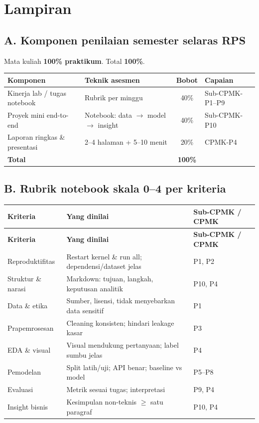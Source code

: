 \chapter*{Lampiran}

\section*{A. Komponen penilaian semester selaras RPS}

Mata kuliah \textbf{100\% praktikum}. Total \textbf{100\%}.

\begin{center}
\small
\begin{tabular}{|p{3.5cm}|p{3.8cm}|c|p{4cm}|}
\hline
\textbf{Komponen} & \textbf{Teknik asesmen} & \textbf{Bobot} & \textbf{Capaian} \\
\hline
Kinerja lab / tugas notebook & Rubrik per minggu & 40\% & Sub-CPMK-P1--P9 \\
\hline
Proyek mini end-to-end & Notebook: data $\rightarrow$ model $\rightarrow$ insight & 40\% & Sub-CPMK-P10 \\
\hline
Laporan ringkas \& presentasi & 2--4 halaman + 5--10 menit & 20\% & CPMK-P4 \\
\hline
\textbf{Total} & & \textbf{100\%} & \\
\hline
\end{tabular}
\end{center}

\section*{B. Rubrik notebook skala 0--4 per kriteria}

{\footnotesize
\begin{longtable}{|p{2.7cm}|p{5.4cm}|p{5cm}|}
\hline
\textbf{Kriteria} & \textbf{Yang dinilai} & \textbf{Sub-CPMK / CPMK} \\
\hline
\endfirsthead
\hline
\textbf{Kriteria} & \textbf{Yang dinilai} & \textbf{Sub-CPMK / CPMK} \\
\hline
\endhead
\hline
\endfoot
Reproduktifitas & Restart kernel \& run all; dependensi/dataset jelas & P1, P2 \\
Struktur \& narasi & Markdown: tujuan, langkah, keputusan analitik & P10, P4 \\
Data \& etika & Sumber, lisensi, tidak menyebarkan data sensitif & P1 \\
Prapemrosesan & Cleaning konsisten; hindari leakage kasar & P3 \\
EDA \& visual & Visual mendukung pertanyaan; label sumbu jelas & P4 \\
Pemodelan & Split latih/uji; API benar; baseline vs model & P5--P8 \\
Evaluasi & Metrik sesuai tugas; interpretasi & P9, P4 \\
Insight bisnis & Kesimpulan non-teknis $\geq$ satu paragraf & P10, P4 \\
\hline
\end{longtable}
}

